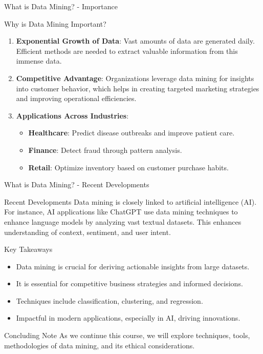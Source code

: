 \documentclass[aspectratio=169]{beamer}
\begin{document}
\begin{frame}[fragile]{What is Data Mining? - Importance}
    \begin{block}{Why is Data Mining Important?}
        \begin{enumerate}
            \item \textbf{Exponential Growth of Data}: Vast amounts of data are generated daily. Efficient methods are needed to extract valuable information from this immense data.
            
            \item \textbf{Competitive Advantage}: Organizations leverage data mining for insights into customer behavior, which helps in creating targeted marketing strategies and improving operational efficiencies.
            
            \item \textbf{Applications Across Industries}:
            \begin{itemize}
                \item \textbf{Healthcare}: Predict disease outbreaks and improve patient care.
                \item \textbf{Finance}: Detect fraud through pattern analysis.
                \item \textbf{Retail}: Optimize inventory based on customer purchase habits.
            \end{itemize}
        \end{enumerate}
    \end{block}
\end{frame}

\begin{frame}[fragile]{What is Data Mining? - Recent Developments}
    \begin{block}{Recent Developments}
        Data mining is closely linked to artificial intelligence (AI). For instance, AI applications like ChatGPT use data mining techniques to enhance language models by analyzing vast textual datasets. This enhances understanding of context, sentiment, and user intent.
    \end{block}

    \begin{block}{Key Takeaways}
        \begin{itemize}
            \item Data mining is crucial for deriving actionable insights from large datasets.
            \item It is essential for competitive business strategies and informed decisions.
            \item Techniques include classification, clustering, and regression.
            \item Impactful in modern applications, especially in AI, driving innovations.
        \end{itemize}
    \end{block}

    \begin{block}{Concluding Note}
        As we continue this course, we will explore techniques, tools, methodologies of data mining, and its ethical considerations.
    \end{block}
\end{frame}
\end{document}
